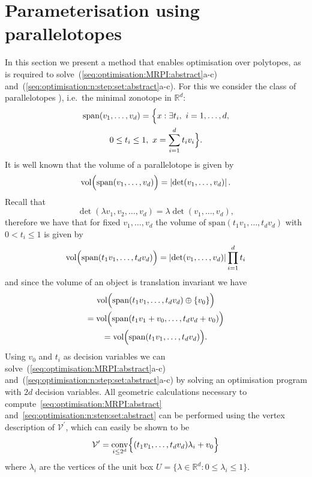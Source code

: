 \documentclass{ifacconf}
\providecommand{\abs}[1]{\left|#1\right|}
\providecommand{\conv}{\text{conv}}
\providecommand{\vol}{\text{vol}}
\providecommand{\spann}{\text{span}}
\providecommand{\V}{\mathcal V}
\providecommand{\RR}{\mathbb R}
\begin{document}
\section{Parameterisation using  parallelotopes}\label{sec:volume:of:hypercube}
%
%
In this section we present a method that enables optimisation over polytopes, as is required to solve~(\ref{seq:optimisation:MRPI:abstract}a-c) and~(\ref{seq:optimisation:n:step:set:abstract}a-c).
%
For this we consider the class of parallelotopes \citep[see
e.g.][]{Coxeter:1973}), i.e.~the minimal zonotope in $\RR^d$: 
\begin{multline*}
  \spann(v_1,\dots,v_d) = \Bigl\{x:\exists t_i, \ 
i = 1,\ldots, d, \\
0 \leq t_i\leq1, \ 
 x = \sum_{i=1}^dt_iv_i\Bigr\}.
\end{multline*}
%
It is well known that the volume of a parallelotope is given by
%
\begin{equation}
	\vol\Bigl(\spann(v_1,\dots,v_d)\Bigr) = \abs{\det(v_1,\dots,v_d)}.
\end{equation}
%
Recall that 
\[
\det(\lambda v_1,v_2,\dots,v_d) = \lambda\det(v_1,\dots,v_d),
\]
therefore we have that for fixed $v_1,\dots,v_d$ the volume of $\spann(t_1v_1,\dots,t_dv_d)$ with $0<t_i\leq1$ is given by
%
\begin{equation}
	\vol\Bigl(\spann(t_1v_1,\dots,t_dv_d)\Bigr) = \abs{\det(v_1,\dots,v_d)}\prod_{i=1}^d t_i
\end{equation}
%
and since the volume of an object is translation invariant we have 
\begin{multline*}
\vol\Bigl(\spann(t_1v_1,\dots,t_dv_d)\oplus\{v_0\}\Bigr) \\
= \vol\Bigl(\spann(t_1v_1+v_0,\dots,t_dv_d+v_0)\Bigr) \\
= \vol\Bigl(\spann(t_1v_1,\dots,t_dv_d)\Bigr).
\end{multline*}
Using $v_0$ and $t_i$ as decision variables we can solve~(\ref{seq:optimisation:MRPI:abstract}a-c) and~(\ref{seq:optimisation:n:step:set:abstract}a-c) by solving an optimisation program with $2d$ decision variables.
%
All geometric calculations necessary to compute~\eqref{seq:optimisation:MRPI:abstract} and~\eqref{seq:optimisation:n:step:set:abstract} can be performed using the vertex description of $\V^\prime$, which can easily be shown to be
%
\begin{equation}
	\V^\prime = \underset{i\leq 2^d}{\conv}\Bigl\{(t_1v_1,\dots,t_dv_d)\lambda_i+v_0\Bigr\}
\end{equation}
%
where $\lambda_i$ are the vertices of the unit box $U = \{\lambda\in\RR^d:0\leq\lambda_i\leq 1\}$.
\end{document}
